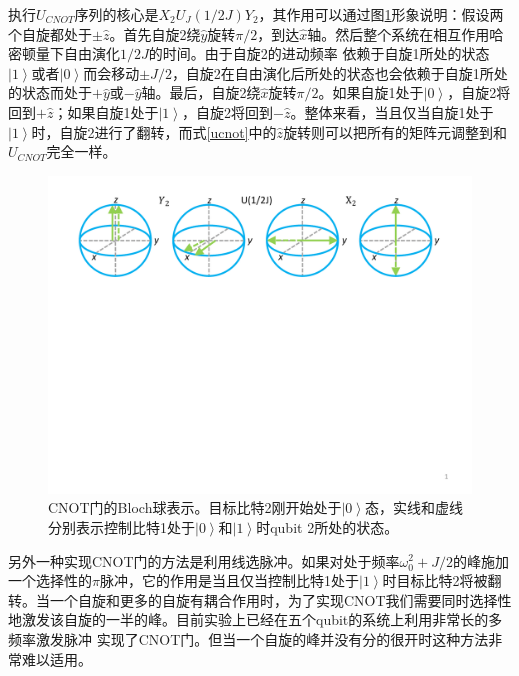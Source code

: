 执行$U_{CNOT}$序列的核心是$X_2U_J(1/2J)Y_2$，其作用可以通过图\ref{nmrcnot}形象说明：假设两个自旋都处于$\pm \hat{z}$。首先自旋2绕$\hat{y}$旋转$\pi/2$，到达$\hat{x}$轴。然后整个系统在相互作用哈密顿量下自由演化$1/2J$的时间。由于自旋2的进动频率
依赖于自旋1所处的状态$\left\vert  1 \right\rangle$或者$\left\vert  0 \right\rangle$而会移动$\pm J/2$，自旋2在自由演化后所处的状态也会依赖于自旋1所处的状态而处于$+\hat{y}$或$-\hat{y}$轴。最后，自旋2绕$\hat{x}$旋转$\pi/2$。如果自旋1处于$\left\vert  0 \right\rangle$，自旋2将回到$+\hat{z}$；如果自旋1处于$\left\vert 1 \right\rangle$，自旋2将回到$-\hat{z}$。整体来看，当且仅当自旋1处于$\left\vert 1 \right\rangle$时，自旋2进行了翻转，而式\ref{ucnot}中的$\hat{z}$旋转则可以把所有的矩阵元调整到和$U_{CNOT}$完全一样。

\begin{figure}[htbp]
            \begin{center}
              \includegraphics[width= 0.8\columnwidth]{figures/nmrcnot.pdf}
              \caption{CNOT门的Bloch球表示。目标比特2刚开始处于$\left\vert  0 \right\rangle$态，实线和虚线分别表示控制比特1处于$\left\vert  0 \right\rangle$和$\left\vert  1 \right\rangle$时qubit 2所处的状态。
              }
              \label{nmrcnot}
            \end{center}
\end{figure}

另外一种实现CNOT门的方法是利用线选脉冲。如果对处于频率$\omega_0^2+J/2$的峰施加一个选择性的$\pi$脉冲，它的作用是当且仅当控制比特1处于$\left\vert  1\right\rangle$时目标比特2将被翻转。当一个自旋和更多的自旋有耦合作用时，为了实现CNOT我们需要同时选择性地激发该自旋的一半的峰。目前实验上已经在五个qubit的系统上利用非常长的多频率激发脉冲 实现了CNOT门\cite{linecnot}。但当一个自旋的峰并没有分的很开时这种方法非常难以适用。

